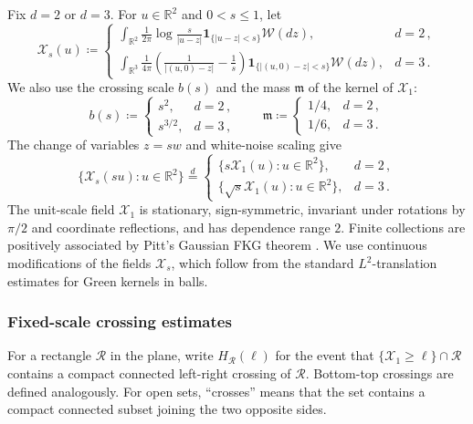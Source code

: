 \documentclass[11pt]{amsart}
\theoremstyle{plain}
\theoremstyle{definition}
\newcommand{\R}{\mathbb{R}}
\begin{document}
Fix $d=2$ or $d=3$. For $u\in\R^2$ and $0<s\leq1$, let
\[
    \mathcal X_s(u)\coloneqq
    \begin{cases}
    \displaystyle
    \int_{\R^2}
    \frac1{2\pi}\log\frac{s}{|u-z|}
    \mathbf 1_{\{|u-z|<s\}}\mathcal W(dz),& d=2\, ,\\[4mm]
    \displaystyle
    \int_{\R^3}
    \frac1{4\pi}\left(\frac1{|(u,0)-z|}-\frac1s\right)
    \mathbf 1_{\{|(u,0)-z|<s\}}\mathcal W(dz),& d=3\, .
    \end{cases}
\]
We also use the crossing scale $b(s)$ and the mass $\mathfrak m$ of the kernel of $\mathcal X_1$:
\begin{equation}\label{eq:continuum-crossing-scale}
    b(s)\coloneqq
    \begin{cases}
    s^2,& d=2\, ,\\
    s^{3/2},& d=3\, ,
    \end{cases}
    \qquad
    \mathfrak m\coloneqq
    \begin{cases}
    1/4,& d=2\, ,\\
    1/6,& d=3\, .
    \end{cases}
\end{equation}
The change of variables $z=sw$ and white-noise scaling give
\begin{equation}\label{eq:cont-field-scaling}
    \{\mathcal X_s(su):u\in\R^2\}\stackrel d=
    \begin{cases}
    \{s\mathcal X_1(u):u\in\R^2\},& d=2\, ,\\
    \{\sqrt{s}\mathcal X_1(u):u\in\R^2\},& d=3\, .
    \end{cases}
\end{equation}
The unit-scale field $\mathcal X_1$ is stationary, sign-symmetric, invariant under
rotations by $\pi/2$ and coordinate reflections, and has dependence range $2$. Finite collections are positively associated by Pitt's Gaussian FKG theorem \citep[Theorem, p.~496, Eq.~(1)]{Pitt}. We use continuous modifications of the fields $\mathcal X_s$, which follow from the standard $L^2$-translation estimates for Green kernels in balls.

\subsubsection{Fixed-scale crossing estimates}\label{ssec:fixed-scale-crossings}

For a rectangle $\mathcal R$ in the plane, write $H_{\mathcal R}(\ell)$ for the
event that $\{\mathcal X_1\geq\ell\}\cap\mathcal R$ contains a compact connected
left-right crossing of $\mathcal R$. Bottom-top crossings are defined
analogously. For open sets, ``crosses'' means that the set contains a compact
connected subset joining the two opposite sides.
\end{document}
